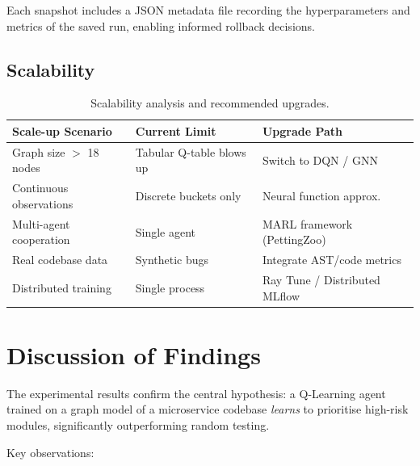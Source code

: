 \documentclass[12pt,a4paper]{report}
\begin{document}
Each snapshot includes a JSON metadata file recording the hyperparameters
and metrics of the saved run, enabling informed rollback decisions.

\subsection{Scalability}

\begin{table}[H]
  \centering
  \caption{Scalability analysis and recommended upgrades.}
  \label{tab:scale}
  \begin{tabular}{lll}
    \toprule
    \textbf{Scale-up Scenario} & \textbf{Current Limit} & \textbf{Upgrade Path} \\
    \midrule
    Graph size $>$ 18 nodes    & Tabular Q-table blows up & Switch to DQN / GNN \\
    Continuous observations    & Discrete buckets only   & Neural function approx. \\
    Multi-agent cooperation    & Single agent            & MARL framework (PettingZoo) \\
    Real codebase data         & Synthetic bugs          & Integrate AST/code metrics \\
    Distributed training       & Single process          & Ray Tune / Distributed MLflow \\
    \bottomrule
  \end{tabular}
\end{table}

\section{Discussion of Findings}

The experimental results confirm the central hypothesis: a Q-Learning
agent trained on a graph model of a microservice codebase \emph{learns}
to prioritise high-risk modules, significantly outperforming random
testing.

Key observations:
\end{document}
